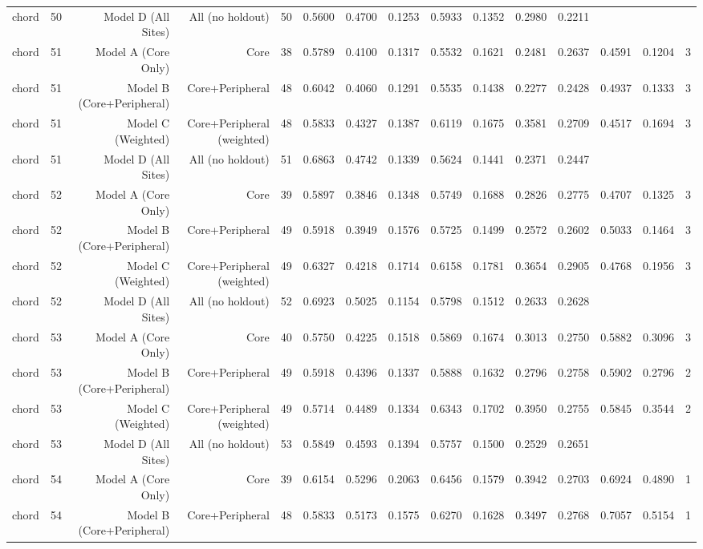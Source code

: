 {\begin{longtable}{lrrrrrrrrrrrrrr}
  chord & 50 & Model D (All Sites) & All (no holdout) & 50 & 0.5600 & 0.4700 & 0.1253 & 0.5933 & 0.1352 & 0.2980 & 0.2211 &  &  &  \\
  chord & 51 & Model A (Core Only) & Core & 38 & 0.5789 & 0.4100 & 0.1317 & 0.5532 & 0.1621 & 0.2481 & 0.2637 & 0.4591 & 0.1204 & 3 \\
  chord & 51 & Model B (Core+Peripheral) & Core+Peripheral & 48 & 0.6042 & 0.4060 & 0.1291 & 0.5535 & 0.1438 & 0.2277 & 0.2428 & 0.4937 & 0.1333 & 3 \\
  chord & 51 & Model C (Weighted) & Core+Peripheral (weighted) & 48 & 0.5833 & 0.4327 & 0.1387 & 0.6119 & 0.1675 & 0.3581 & 0.2709 & 0.4517 & 0.1694 & 3 \\
  chord & 51 & Model D (All Sites) & All (no holdout) & 51 & 0.6863 & 0.4742 & 0.1339 & 0.5624 & 0.1441 & 0.2371 & 0.2447 &  &  &  \\
  chord & 52 & Model A (Core Only) & Core & 39 & 0.5897 & 0.3846 & 0.1348 & 0.5749 & 0.1688 & 0.2826 & 0.2775 & 0.4707 & 0.1325 & 3 \\
  chord & 52 & Model B (Core+Peripheral) & Core+Peripheral & 49 & 0.5918 & 0.3949 & 0.1576 & 0.5725 & 0.1499 & 0.2572 & 0.2602 & 0.5033 & 0.1464 & 3 \\
  chord & 52 & Model C (Weighted) & Core+Peripheral (weighted) & 49 & 0.6327 & 0.4218 & 0.1714 & 0.6158 & 0.1781 & 0.3654 & 0.2905 & 0.4768 & 0.1956 & 3 \\
  chord & 52 & Model D (All Sites) & All (no holdout) & 52 & 0.6923 & 0.5025 & 0.1154 & 0.5798 & 0.1512 & 0.2633 & 0.2628 &  &  &  \\
  chord & 53 & Model A (Core Only) & Core & 40 & 0.5750 & 0.4225 & 0.1518 & 0.5869 & 0.1674 & 0.3013 & 0.2750 & 0.5882 & 0.3096 & 3 \\
  chord & 53 & Model B (Core+Peripheral) & Core+Peripheral & 49 & 0.5918 & 0.4396 & 0.1337 & 0.5888 & 0.1632 & 0.2796 & 0.2758 & 0.5902 & 0.2796 & 2 \\
  chord & 53 & Model C (Weighted) & Core+Peripheral (weighted) & 49 & 0.5714 & 0.4489 & 0.1334 & 0.6343 & 0.1702 & 0.3950 & 0.2755 & 0.5845 & 0.3544 & 2 \\
  chord & 53 & Model D (All Sites) & All (no holdout) & 53 & 0.5849 & 0.4593 & 0.1394 & 0.5757 & 0.1500 & 0.2529 & 0.2651 &  &  &  \\
  chord & 54 & Model A (Core Only) & Core & 39 & 0.6154 & 0.5296 & 0.2063 & 0.6456 & 0.1579 & 0.3942 & 0.2703 & 0.6924 & 0.4890 & 1 \\
  chord & 54 & Model B (Core+Peripheral) & Core+Peripheral & 48 & 0.5833 & 0.5173 & 0.1575 & 0.6270 & 0.1628 & 0.3497 & 0.2768 & 0.7057 & 0.5154 & 1 \\

\end{longtable}}
